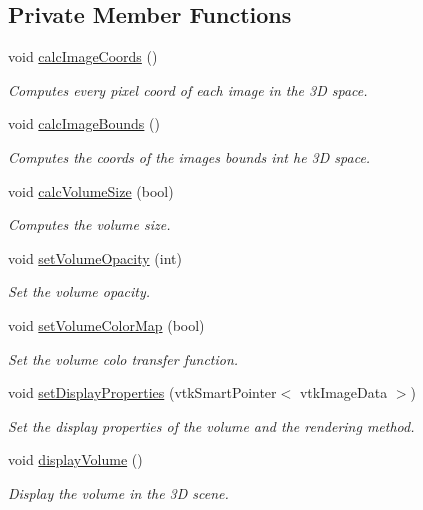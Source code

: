 \subsection*{Private Member Functions}
\begin{DoxyCompactItemize}
\item 
void \hyperlink{class_volume_reconstruction_widget_a8a4852fab62c5f8512f758cb3a106071}{calc\-Image\-Coords} ()
\begin{DoxyCompactList}\small\item\em Computes every pixel coord of each image in the 3\-D space. \end{DoxyCompactList}\item 
void \hyperlink{class_volume_reconstruction_widget_a6645ccc86f2b2b02e38835f191a96464}{calc\-Image\-Bounds} ()
\begin{DoxyCompactList}\small\item\em Computes the coords of the images bounds int he 3\-D space. \end{DoxyCompactList}\item 
void \hyperlink{class_volume_reconstruction_widget_aacf14912ac38b5633f01bb3c742f54f4}{calc\-Volume\-Size} (bool)
\begin{DoxyCompactList}\small\item\em Computes the volume size. \end{DoxyCompactList}\item 
void \hyperlink{class_volume_reconstruction_widget_a24a0314f3c08b8c878518e72da5fad3e}{set\-Volume\-Opacity} (int)
\begin{DoxyCompactList}\small\item\em Set the volume opacity. \end{DoxyCompactList}\item 
void \hyperlink{class_volume_reconstruction_widget_abaeb27296325b0fe55125337e73cbea8}{set\-Volume\-Color\-Map} (bool)
\begin{DoxyCompactList}\small\item\em Set the volume colo transfer function. \end{DoxyCompactList}\item 
void \hyperlink{class_volume_reconstruction_widget_a318c42b0fc54dda95cf2a71346f994ff}{set\-Display\-Properties} (vtk\-Smart\-Pointer$<$ vtk\-Image\-Data $>$)
\begin{DoxyCompactList}\small\item\em Set the display properties of the volume and the rendering method. \end{DoxyCompactList}\item 
void \hyperlink{class_volume_reconstruction_widget_a09883a3dbf07b5edf1dae1ce20bbbc29}{display\-Volume} ()
\begin{DoxyCompactList}\small\item\em Display the volume in the 3\-D scene. \end{DoxyCompactList}\end{DoxyCompactItemize}
